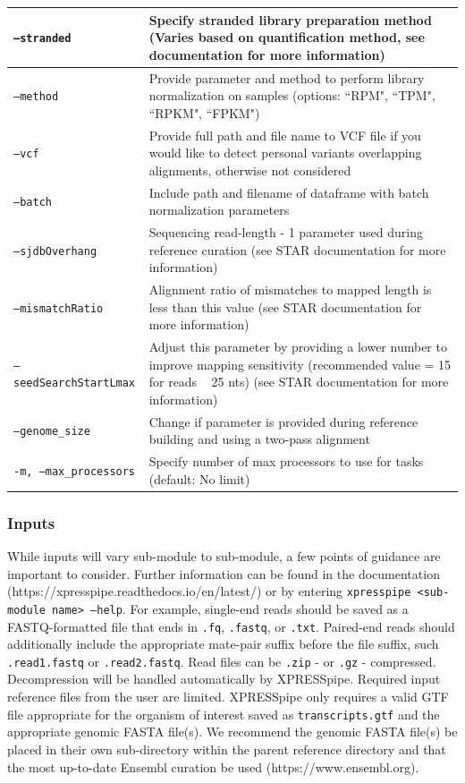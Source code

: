 \documentclass[10pt, oneside]{article}
\begin{document}
\begin{table}[!]
\begin{tabular}{p{5cm}p{13cm}}
 \hline
 \texttt{--stranded} & Specify stranded library preparation method (Varies based on quantification method, see documentation for more information) \\
 \hline
 \texttt{--method} & Provide parameter and method to perform library normalization on samples (options: ``RPM", ``TPM", ``RPKM", ``FPKM") \\
 \hline
 \texttt{--vcf} & Provide full path and file name to VCF file if you would like to detect personal variants overlapping alignments, otherwise not considered \\
 \hline
 \texttt{--batch} & Include path and filename of dataframe with batch normalization parameters \\
 \hline
 \texttt{--sjdbOverhang} & Sequencing read-length - 1 parameter used during reference curation (see STAR documentation for more information) \\
 \hline
 \texttt{--mismatchRatio} & Alignment ratio of mismatches to mapped length is less than this value (see STAR documentation for more information) \\
 \hline
 \texttt{--seedSearchStartLmax} & Adjust this parameter by providing a lower number to improve mapping sensitivity (recommended value = 15 for reads ~ 25 nts) (see STAR documentation for more information) \\
 \hline
 \texttt{--genome\_size} & Change if parameter is provided during reference building and using a two-pass alignment \\
 \hline
 \texttt{-m, --max\_processors} & Specify number of max processors to use for tasks (default: No limit) \\
\end{tabular}
\end{table}



\subsubsection{Inputs}
While inputs will vary sub-module to sub-module, a few points of guidance are important to consider. Further information can be found in the documentation (https://xpresspipe.readthedocs.io/en/latest/) or by entering \texttt{xpresspipe \textless sub-module name\textgreater \ --help}. For example, single-end reads should be saved as a FASTQ-formatted file that ends in \texttt{.fq}, \texttt{.fastq}, or \texttt{.txt}. Paired-end reads should additionally include the appropriate mate-pair suffix before the file suffix, such \texttt{.read1.fastq} or \texttt{.read2.fastq}. Read files can be \texttt{.zip} - or \texttt{.gz} - compressed. Decompression will be handled automatically by XPRESSpipe. Required input reference files from the user are limited. XPRESSpipe only requires a valid GTF file appropriate for the organism of interest saved as \texttt{transcripts.gtf} and the appropriate genomic FASTA file(s). We recommend the genomic FASTA file(s) be placed in their own sub-directory within the parent reference directory and that the most up-to-date Ensembl curation be used (https://www.ensembl.org).
\end{document}
